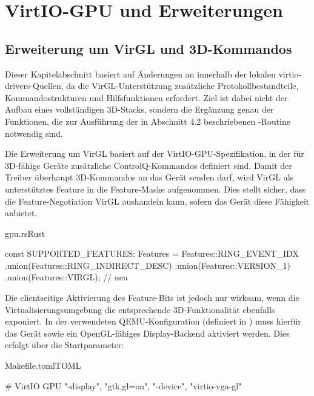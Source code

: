 \chapter{VirtIO-GPU und Erweiterungen}

\section{Erweiterung um VirGL und 3D-Kommandos}

Dieser Kapitelabschnitt basiert auf Änderungen an  innerhalb der lokalen virtio-drivers-Quellen, da die VirGL-Unterstützung zusätzliche Protokollbestandteile, Kommandostrukturen und Hilfsfunktionen erfordert. Ziel ist dabei nicht der Aufbau eines vollständigen 3D-Stacks, sondern die Ergänzung genau der Funktionen, die zur Ausführung der in Abschnitt 4.2 beschriebenen -Routine notwendig sind.

Die Erweiterung um VirGL basiert auf der VirtIO-GPU-Spezifikation, in der für 3D-fähige Geräte zusätzliche ControlQ-Kommandos definiert sind.
Damit der Treiber überhaupt 3D-Kommandos an das Gerät senden darf, wird VirGL als unterstütztes Feature in die Feature-Maske aufgenommen. Dies stellt sicher, dass die Feature-Negotiation VirGL aushandeln kann, sofern das Gerät diese Fähigkeit anbietet.

\begin{codeblock}{gpu.rs}{Rust}
  \begin{rustcode}
const SUPPORTED_FEATURES: Features = Features::RING_EVENT_IDX
    .union(Features::RING_INDIRECT_DESC)
    .union(Features::VERSION_1)
    .union(Features::VIRGL); // neu
  \end{rustcode}
\end{codeblock}

Die clientseitige Aktivierung des Feature-Bits ist jedoch nur wirksam, wenn die Virtualisierungsumgebung die entsprechende 3D-Funktionalität ebenfalls exponiert. In der verwendeten QEMU-Konfiguration (definiert in ) muss hierfür das Gerät  sowie ein OpenGL-fähiges Display-Backend aktiviert werden. Dies erfolgt über die Startparameter:

\begin{codeblock}{Makefile.toml}{TOML}
  \begin{rustcode}
# VirtIO GPU
"-display", "gtk,gl=on", "-device", "virtio-vga-gl"
  \end{rustcode}
\end{codeblock}

